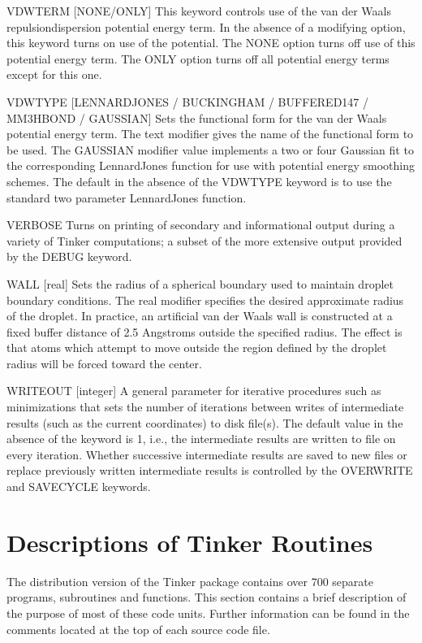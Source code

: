 \documentclass[letterpaper,11pt,english]{sphinxmanual}
\begin{document}
VDWTERM {[}NONE/ONLY{]}     This keyword controls use of the van der Waals repulsion\sphinxhyphen{}dispersion potential energy term. In the absence of a modifying option, this keyword turns on use of the potential. The NONE option turns off use of this potential energy term. The ONLY option turns off all potential energy terms except for this one.

VDWTYPE {[}LENNARD\sphinxhyphen{}JONES / BUCKINGHAM / BUFFERED\sphinxhyphen{}14\sphinxhyphen{}7 / MM3\sphinxhyphen{}HBOND / GAUSSIAN{]}     Sets the functional form for the van der Waals potential energy term. The text modifier gives the name of the functional form to be used. The GAUSSIAN modifier value implements a two or four Gaussian fit to the corresponding Lennard\sphinxhyphen{}Jones function for use with potential energy smoothing schemes. The default in the absence of the VDWTYPE keyword is to use the standard two parameter Lennard\sphinxhyphen{}Jones function.

VERBOSE     Turns on printing of secondary and informational output during a variety of Tinker computations; a subset of the more extensive output provided by the DEBUG keyword.

WALL {[}real{]}     Sets the radius of a spherical boundary used to maintain droplet boundary conditions. The real modifier specifies the desired approximate radius of the droplet. In practice, an artificial van der Waals wall is constructed at a fixed buffer distance of 2.5 Angstroms outside the specified radius. The effect is that atoms which attempt to move outside the region defined by the droplet radius will be forced toward the center.

WRITEOUT {[}integer{]}     A general parameter for iterative procedures such as minimizations that sets the number of iterations between writes of intermediate results (such as the current coordinates) to disk file(s). The default value in the absence of the keyword is 1, i.e., the intermediate results are written to file on every iteration. Whether successive intermediate results are saved to new files or replace previously written intermediate results is controlled by the OVERWRITE and SAVE\sphinxhyphen{}CYCLE keywords.


\chapter{Descriptions of Tinker Routines}
\label{\detokenize{text/routines:descriptions-of-tinker-routines}}\label{\detokenize{text/routines::doc}}
The distribution version of the Tinker package contains over 700 separate programs, subroutines and functions. This section contains a brief description of the purpose of most of these code units. Further information can be found in the comments located at the top of each source code file.
\end{document}
